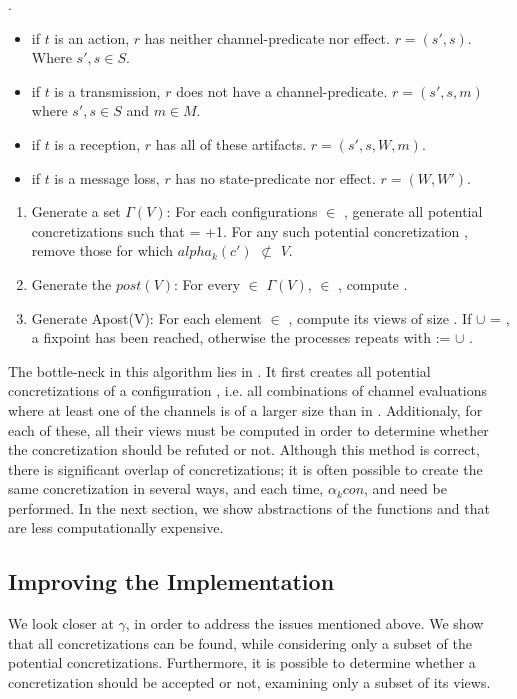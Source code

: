 .
\begin{itemize}
\item
if $t$ is an action, $r$ has neither channel-predicate nor effect. $r = (s', s)$. Where $s', s \in S$.
\item
if $t$ is a transmission, $r$ does not have a channel-predicate. $r = (s', s, m)$ where $s', s \in S$ and $m \in M$.
\item
if $t$ is a reception, $r$ has all of these artifacts. $r = (s', s, W, m)$.
\item
if $t$ is a message loss, $r$ has no state-predicate nor effect. $r = (W, W')$.
\end{itemize}

\begin{enumerate}
\item
Generate a set $\Gamma(V)$: For each configurations  $\in$ , generate all potential concretizations  such that  = +1. For any such potential concretization , remove those for which $alpha_k(c')$ $\not\subset$ $V$.

\item
Generate the $post(V)$: For every  $\in$ $\Gamma(V)$,  $\in$ , compute .

\item
Generate Apost(V): For each element  $\in$ , compute its views of size . If  $\cup$  = , a fixpoint has been reached, otherwise the processes repeats with  :=  $\cup$ .
\end{enumerate}

The bottle-neck in this algorithm lies in . It first creates all potential concretizations of a configuration , i.e. all combinations of channel evaluations where at least one of the channels is of a larger size than in . Additionaly, for each of these, all their views must be computed in order to determine whether the concretization should be refuted or not. Although this method is correct, there is significant overlap of concretizations; it is often possible to create the same concretization  in several ways, and each time, $\alpha_k{con}$,  and  need be performed. In the next section, we show abstractions of the functions  and  that are less computationally expensive.


\subsection{Improving the Implementation}
We look closer at $\gamma$, in order to address the issues mentioned above. We show that all concretizations can be found, while considering only a subset of the potential concretizations. Furthermore, it is possible to determine whether a concretization should be accepted or not, examining only a subset of its views.

